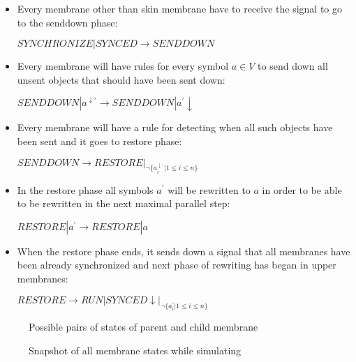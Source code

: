 \begin{dokaz}
\begin{itemize}
    \item Every membrane other than skin membrane have to receive the signal to go to the senddown phase:

    $\mathit{SYNCHRONIZE}|\mathit{SYNCED} \rightarrow \mathit{SENDDOWN}$

    \item Every membrane will have rules for every symbol $a\in V$ to send down all unsent objects that should have been sent down:

    $\mathit{SENDDOWN}|a^{\downarrow\prime} \rightarrow \mathit{SENDDOWN}|a^{\prime}\downarrow$

    \item Every membrane will have a rule for detecting when all such objects have been sent and it goes to restore phase:

    $\mathit{SENDDOWN} \rightarrow \mathit{RESTORE}|_{\neg \{a_i^{\downarrow\prime}|1\leq i\leq n\}}$

    \item In the restore phase all symbols $a^{\prime}$ will be rewritten to $a$ in order to be able to be rewritten in the next maximal parallel step:

    $\mathit{RESTORE}|a^{\prime} \rightarrow \mathit{RESTORE}|a$

    \item When the restore phase ends, it sends down a signal that all membranes have been already synchronized and next phase of rewriting has began in upper membranes:

    $\mathit{RESTORE} \rightarrow \mathit{RUN}|\mathit{SYNCED}\downarrow|_{\neg \{a_i^{\prime}|1\leq i\leq n\}}$
  \end{itemize}

  \providecommand{\narrow}[1]{\scalebox{.85}[1.0]{#1}}

  \begin{figure}
    \def\svgwidth{\textwidth}
    
    \caption{Possible pairs of states of parent and child membrane}
    \label{fig:possible_pairs_of_states_of_parent_and_child_membrane}
  \end{figure}

  \begin{figure}
    \def\svgwidth{\textwidth}
    
    \caption{Snapshot of all membrane states while simulating}
    \label{fig:snapshot_of_all_membrane_states_while_simulating}
  \end{figure}


\end{dokaz}
